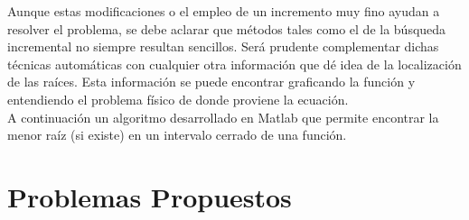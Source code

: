 \documentclass[12pt,letterpaper]{article}
\theoremstyle{definition}
\theoremstyle{plain}
\theoremstyle{remark}
\begin{document}
Aunque estas modificaciones o el empleo de un incremento muy fino ayudan a resolver el problema, se debe aclarar que métodos tales como el de la búsqueda incremental no siempre resultan sencillos. Será prudente complementar dichas técnicas automáticas con cualquier otra información que dé idea de la localización de las raíces. Esta información se puede encontrar graficando la función y entendiendo el problema físico de donde proviene la ecuación.\\

A continuación un algoritmo desarrollado en Matlab que permite encontrar la menor raíz (si existe) en un intervalo cerrado de una función.



\newpage

\section*{Problemas Propuestos}
\end{document}
